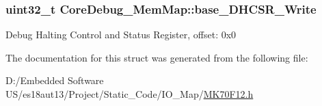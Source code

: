 \subsubsection[{base\+\_\+\+D\+H\+C\+S\+R\+\_\+\+Write}]{\setlength{\rightskip}{0pt plus 5cm}uint32\+\_\+t Core\+Debug\+\_\+\+Mem\+Map\+::base\+\_\+\+D\+H\+C\+S\+R\+\_\+\+Write}\label{struct_core_debug___mem_map_a57de52c8c1eb5789546543f2408ce487}
Debug Halting Control and Status Register, offset\+: 0x0 

The documentation for this struct was generated from the following file\+:\begin{DoxyCompactItemize}
\item 
D\+:/\+Embedded Software U\+S/es18aut13/\+Project/\+Static\+\_\+\+Code/\+I\+O\+\_\+\+Map/\hyperlink{_m_k70_f12_8h}{M\+K70\+F12.\+h}\end{DoxyCompactItemize}
